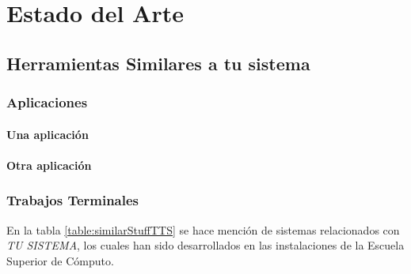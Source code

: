 \section{Estado del Arte}

\blindtext[2]


\subsection{Herramientas Similares a tu sistema}
\subsubsection{Aplicaciones}

\paragraph{Una aplicación \\}
\blindtext[2]


\paragraph{Otra aplicación \\}

\blindtext[2] 



\subsubsection{Trabajos Terminales}
 
 

 
En la tabla \ref{table:similarStuffTTS} se hace mención de sistemas relacionados con \textit{TU SISTEMA}, los cuales han sido desarrollados en las instalaciones de la Escuela Superior de Cómputo.
	
